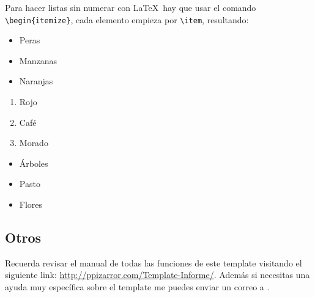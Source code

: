		Para hacer listas sin numerar con \LaTeX\ hay que usar el comando \texttt{\textbackslash begin\{itemize\}}, cada elemento empieza por \texttt{\textbackslash item}, resultando:
		
		\begin{multicols}{3}
			\begin{itemize}[label={--}]
				\item Peras
				\item Manzanas
				\item Naranjas
			\end{itemize}
			
			\begin{enumerate}[label={*}]
				\item Rojo
				\item Café
				\item Morado
			\end{enumerate}
			
			\begin{itemize}
				\item Árboles
				\item Pasto
				\item Flores
			\end{itemize}
		\end{multicols}
		
	\subsection{Otros}
		
		Recuerda revisar el manual de todas las funciones de este template visitando el siguiente link: \url{http://ppizarror.com/Template-Informe/}. Además si necesitas una ayuda muy específica sobre el template me puedes enviar un correo a .

